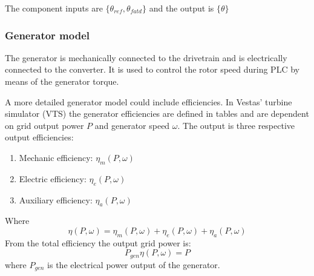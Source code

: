 
The component inputs are $ \{\theta_{ref}, \theta_{fatd}  \} $ and the output is $ \{\theta \} $


\subsubsection{Generator model} \label{sec:comp_generator_eff}
The generator is mechanically connected to the drivetrain and is electrically connected to the converter. It is used to control the rotor speed during PLC by means of the generator torque.

A more detailed generator model could include efficiencies. In Vestas' turbine simulator (VTS) the generator efficiencies are defined in tables and are dependent on grid output power $ P $ and generator speed $ \omega $. The output is three respective output efficiencies: 
\begin{enumerate}
	\item Mechanic efficiency: $ \eta_m(P,\omega) $
	\item Electric efficiency: $ \eta_e(P,\omega) $
	\item Auxiliary efficiency: $ \eta_a(P,\omega) $
\end{enumerate}
Where 
\begin{equation}\label{eq:comp_gen_effi_eff}
	\eta(P,\omega) = \eta_m(P,\omega) + \eta_e(P,\omega) + \eta_a(P,\omega)
\end{equation}
From the total efficiency the output grid power is:
\begin{equation}\label{eq:comp_gen_elec_pow_eff}
	P_{gen} \eta(P,\omega) = P
\end{equation}
where $ P_{gen} $ is the electrical power output of the generator.

